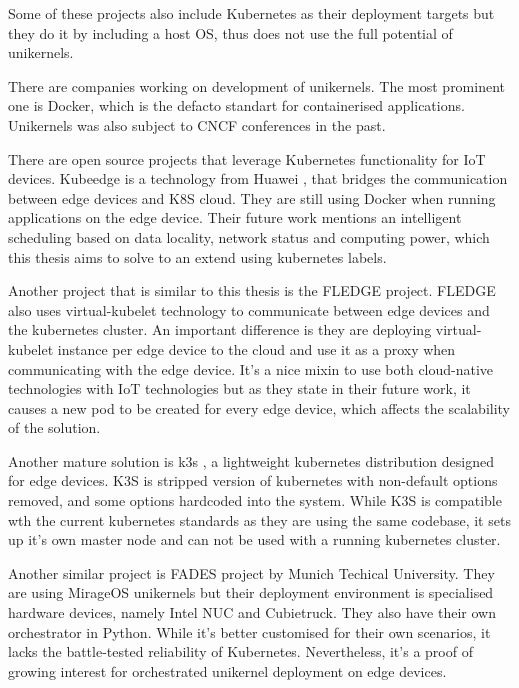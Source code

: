 Some of these projects also include Kubernetes as their deployment targets but they do it by including a host OS, thus does not use the full potential of unikernels.

There are companies working on development of unikernels. The most prominent one is Docker, which is the defacto standart for containerised applications. \cite{francia_2016} Unikernels was also subject to CNCF conferences in the past.


There are open source projects that leverage Kubernetes functionality for IoT devices. Kubeedge \cite{kubeedge} is a technology from Huawei , that bridges the communication between edge devices and K8S cloud. They are still using Docker when running applications on the edge device. Their future work mentions an intelligent scheduling based on data locality, network status and computing power, which this thesis aims to solve to an extend using kubernetes labels.

Another project that is similar to this thesis is the FLEDGE project.\cite{fledge} FLEDGE also uses virtual-kubelet technology to communicate between edge devices and the kubernetes cluster. An important difference is they are deploying virtual-kubelet instance per edge device to the cloud and use it as a proxy when communicating with the edge device. It's a nice mixin to use both cloud-native technologies with IoT technologies but as they state in their future work, it causes a new pod to be created for every edge device, which affects the scalability of the solution.

Another mature solution is k3s \cite{k3s}, a lightweight kubernetes distribution designed for edge devices. K3S is stripped version of kubernetes with non-default options removed, and some options hardcoded into the system. While K3S is compatible wth the current kubernetes standards as they are using the same codebase, it sets up it's own master node and can not be used with a running kubernetes cluster.

Another similar project is FADES \cite{fades} project by Munich Techical University. They are using MirageOS unikernels but their deployment environment is specialised hardware devices, namely Intel NUC and Cubietruck. They also have their own orchestrator in Python. While it's better customised for their own scenarios, it lacks the battle-tested reliability of Kubernetes. Nevertheless, it's a proof of growing interest for orchestrated unikernel deployment on edge devices.